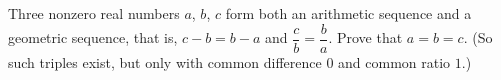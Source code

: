 Three nonzero real numbers $a$, $b$, $c$ form both an arithmetic sequence and a geometric sequence, that is, $c-b=b-a$ and $\dfrac {c}{b}=\dfrac {b}{a}$. Prove that $a=b=c$. (So such triples exist, but only with common difference $0$ and common ratio $1$.)
